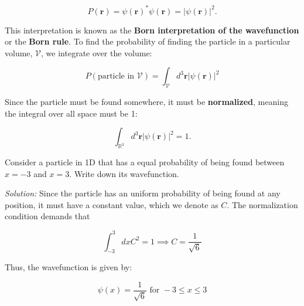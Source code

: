 \begin{equation}
	P(\mathbf{r}) = \psi(\mathbf{r})^*\psi(\mathbf{r}) = |\psi(\mathbf{r})|^2.
\end{equation}

This interpretation is known as the \textbf{Born interpretation of the wavefunction} or the \textbf{Born rule}. To find the probability of finding the particle in a particular volume, $ \mathcal{V} $, we integrate over the volume:

\begin{equation}
	P(\text{particle in } \mathcal{V}) = \int_{\mathcal{V}} d^3\mathbf{r} |\psi(\mathbf{r})|^2 
\end{equation}

Since the particle must be found somewhere, it must be \textbf{normalized}, meaning the integral over all space must be 1:

\begin{equation}
	\int_{\mathbb{R}^3} d^3\mathbf{r} |\psi(\mathbf{r})|^2 = 1.
\end{equation}

\begin{example}
	Consider a particle in 1D that has a equal probability of being found between $x = -3$ and $x = 3$. Write down its wavefunction.
	
	\textit{Solution: } Since the particle has an uniform probability of being found at any position, it must have a constant value, which we denote as $C$. The normalization condition demands that
	
	\begin{equation}
		\int_{-3}^3 dx C^2 = 1 \implies C = \frac{1}{\sqrt{6}} 
	\end{equation}
	
	Thus, the wavefunction is given by:
	
	\begin{equation}
		\psi(x) = \frac{1}{\sqrt{6}} \text{ for } -3 \leq x \leq 3
	\end{equation}
\end{example}

